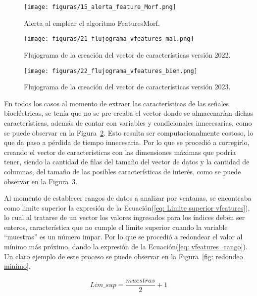 \begin{figure}[t]
    \centering
    \texttt{[image: figuras/15\_alerta\_feature\_Morf.png]}
    \caption{Alerta al emplear el algoritmo FeaturesMorf.}
    \label{fig:yo_warning_uno}
\end{figure}

\begin{figure}[t]
    \centering
    \texttt{[image: figuras/21\_flujograma\_vfeatures\_mal.png]}
    \caption{Flujograma de la creación del vector de características versión 2022.}
    \label{flu:vfeatures malo}
\end{figure}

\begin{figure}[t]
    \centering
    \texttt{[image: figuras/22\_flujograma\_vfeatures\_bien.png]}
    \caption{Flujograma de la creación del vector de características versión 2023.}
    \label{flu:vfeatures bueno}
\end{figure}

En todos los casos al momento de extraer las características de las señales bioeléctricas, se tenía que no se pre-creaba el vector donde se almacenarían dichas características, además de contar con variables y condicionales innecesarias, como se puede observar en la Figura~\ref{flu:vfeatures malo}. Esto resulta ser computacionalmente costoso, lo que da paso a pérdida de tiempo innecesaria. Por lo que se procedió a corregirlo, creando el vector de características con las dimensiones máximas que podría tener, siendo la cantidad de filas del tamaño del vector de datos y la cantidad de columnas, del tamaño de las posibles características de interés, como se puede observar en la Figura~\ref{flu:vfeatures bueno}.

Al momento de establecer rangos de datos a analizar por ventanas, se encontraba como limite superior la expresión de la Ecuación(\ref{eq: Limite superior vfeatures}), lo cual al tratarse de un vector los valores ingresados para los índices deben ser enteros, característica que no cumple el limite superior cuando la variable ``muestras'' es un número impar. Por lo que se procedió a redondear el valor al mínimo más próximo, dando la expresión de la Ecuación(\ref{eq: vfeatures_rango}). Un claro ejemplo de este proceso se puede observar en la Figura~\ref{fig: redondeo minimo}. 

\begin{equation}
    Lim\_sup = \frac{muestras}{2} + 1
    \label{eq: Limite superior vfeatures}
\end{equation}

